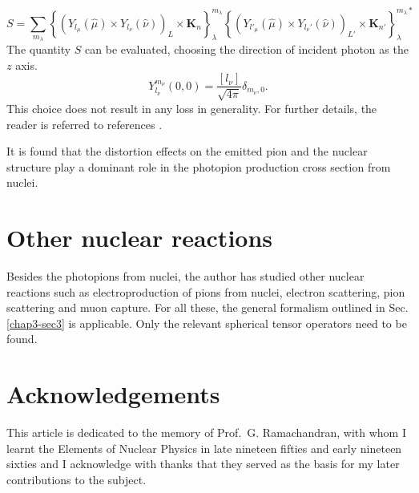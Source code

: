 \begin{equation}
  S= \sum_{m_\lambda} \left\{ (Y_{l_\mu} (\hat{\mu}) \times Y_{l_\nu} (\hat{\nu}))_L \times {\boldsymbol K}_n\right\}_\lambda^{m_\lambda} \left\{(Y_{l'_\mu} (\hat{\mu}) \times Y_{l_\nu'}(\hat{\nu}))_{L'} \times {\boldsymbol K}_{n'} \right\}_{\lambda}^{m_\lambda\ast} \label{chap3-eq60}
\end{equation}
The quantity $S$ can be evaluated, choosing the direction of incident photon as the $z$ axis.
$$
Y_{l_\nu}^{m_\nu} (0, 0) = \frac{[l_\nu]}{\sqrt{4\pi}}\delta_{m_\nu, 0}.
$$
This choice does not result in any loss in generality. For further details, the reader is referred to references \cite{chap3-key20, chap3-key21}.

It is found that the distortion effects on the emitted pion and the nuclear structure play a dominant role \cite{chap3-key21} in the photopion production cross section from nuclei.

\section{Other nuclear reactions}\label{chap3-sec6}

Besides the photopions from nuclei, the author has studied other nuclear reactions such as electroproduction of pions from nuclei, electron scattering, pion scattering and muon capture. For all these, the general formalism outlined in Sec.\ref{chap3-sec3} is applicable. Only the relevant spherical tensor operators need to be found.
\bigskip

\section*{Acknowledgements}

This article is dedicated to the memory of Prof.\ G. Ramachandran, with whom I learnt the Elements of Nuclear Physics in late nineteen fifties and early nineteen sixties and I acknowledge with thanks that they served as the basis for my later contributions to the subject.


